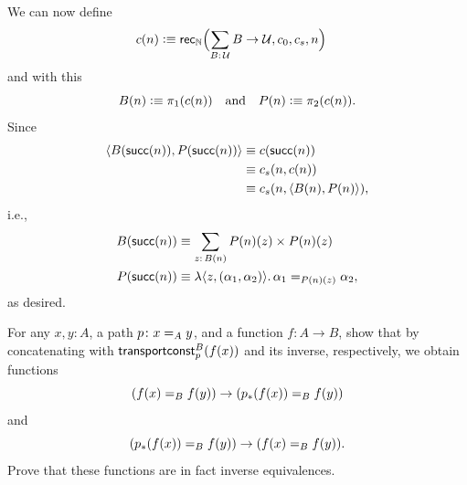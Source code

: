 \begin{solution}
    We can now define
    \begin{align*}
        c(n)&\defeq\fun{rec}_\N
            \Bigl(
                \sum_{B\colon\univ}B\to\univ,
                c_0,
                c_s,
                n
            \Bigr)
    \end{align*}
    and with this
    \[
        B(n)\mathrel{\vcentcolon}\equiv\pi_1(c(n))
        \quad\text{and}\quad
        P(n)\mathrel{\vcentcolon}\equiv\pi_2(c(n)).
    \]
    Since
    \begin{align*}
        \langle B(\mathsf{succ}(n)),P(\mathsf{succ}(n))\rangle
            &\equiv c(\mathsf{succ}(n))\\
            &\equiv c_s(n,c(n))\\
            &\equiv c_s(n,\langle B(n),P(n)\rangle),
    \end{align*}
    i.e.,
    \begin{align*}
        B(\fun{succ}(n))
            &\equiv\sum_{z\colon B(n)}
                P(n)(z)\times P(n)(z)\\
        P(\fun{succ}(n))&\equiv
            \lambda\dep{z,(\alpha_1,\alpha_2)}.\,
                \alpha_1\eq{P(n)(z)}\alpha_2,
    \end{align*}
    as desired.
\end{solution}

\begin{exr}
    For any\/ $x, y\colon A$, a path\/ $p\colon x\eq{A}y$, and a function\/ $f\colon A\to B$, show that by concatenating with\/ $\mathsf{transportconst}^B_p(f(x))$ and its inverse, respectively, we obtain functions
    \[
        (f(x)\mathrel{=_{B}}f(y))\to(p_*(f(x))\mathrel{=_{B}}f(y))
    \]
    and
    \[
        (p_*(f(x))\mathrel{=_{B}}f(y))\to(f(x)\mathrel{=_{B}}f(y)).
    \]
    Prove that these functions are in fact inverse equivalences.
\end{exr}


